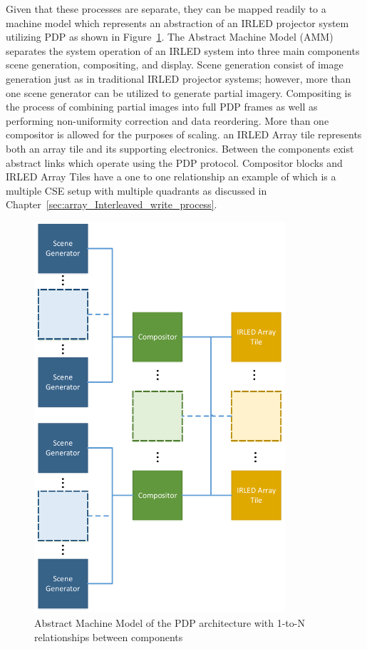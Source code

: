     Given that these processes are separate, they can be mapped readily to a machine model which represents an abstraction of an IRLED projector system utilizing PDP as shown in Figure~\ref{fig:amm}. The Abstract Machine Model (AMM) separates the system operation of an IRLED system into three main components scene generation, compositing, and display. Scene generation consist of image generation just as in traditional IRLED projector systems; however, more than one scene generator can be utilized to generate partial imagery. Compositing is the process of combining partial images into full PDP frames as well as performing non-uniformity correction and data reordering. More than one compositor is allowed for the purposes of scaling. an IRLED Array tile represents both an array tile and its supporting electronics. Between the components exist abstract links which operate using the PDP protocol. Compositor blocks and IRLED Array Tiles have a one to one relationship an example of which is a multiple CSE setup with multiple quadrants as discussed in Chapter~\ref{sec:array_Interleaved_write_process}.

    \begin{figure}
        \centering
        \includegraphics[width=0.83\textwidth]{fig/amm.pdf}
        \caption{Abstract Machine Model of the PDP architecture with 1-to-N relationships between components}
        \label{fig:amm}
    \end{figure}

